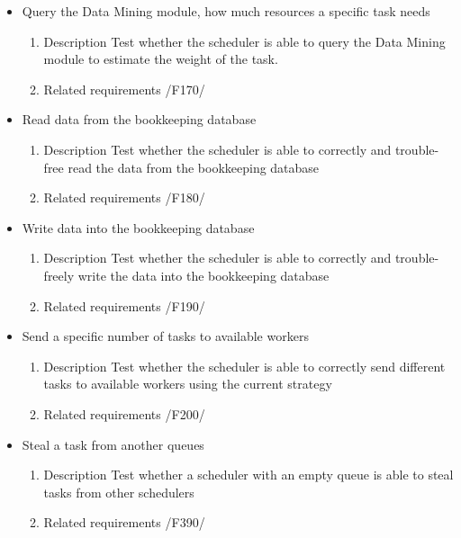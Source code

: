 {\begin{itemize}
				\item Query the Data Mining module, how much resources a specific task needs
				\begin{enumerate}
					\item Description\newline
Test whether the scheduler is able to query the Data Mining module to estimate the weight of the task.
					\item Related requirements\newline
						/F170/
				\end{enumerate}
				
				
				\item Read data from the bookkeeping database
				\begin{enumerate}
					\item Description\newline
Test whether the scheduler is able to correctly and trouble-free read the data from the bookkeeping database
					\item Related requirements\newline
						/F180/
				\end{enumerate}
				
				
				\item Write data into the bookkeeping database
				\begin{enumerate}
					\item Description\newline
Test whether the scheduler is able to correctly and trouble-freely write the data into the bookkeeping database
					\item Related requirements\newline
						/F190/
				\end{enumerate}
				
				
				\item Send a specific number of tasks to available workers
				\begin{enumerate}
					\item Description\newline
Test whether the scheduler is able to correctly send different tasks to available workers using the current strategy
					\item Related requirements\newline
						/F200/
				\end{enumerate}
								
			
			
			
				\item Steal a task from another queues
				\begin{enumerate}
					\item Description\newline
Test whether a scheduler with an empty queue is able to steal tasks from other schedulers
					\item Related requirements\newline
						/F390/
				\end{enumerate}
							

\end{itemize}}
